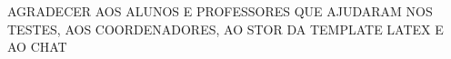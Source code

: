 
%

\begin{ntacknowledgements}

AGRADECER AOS ALUNOS E PROFESSORES QUE AJUDARAM NOS TESTES, AOS COORDENADORES, AO STOR DA TEMPLATE LATEX E AO CHAT
\end{ntacknowledgements}